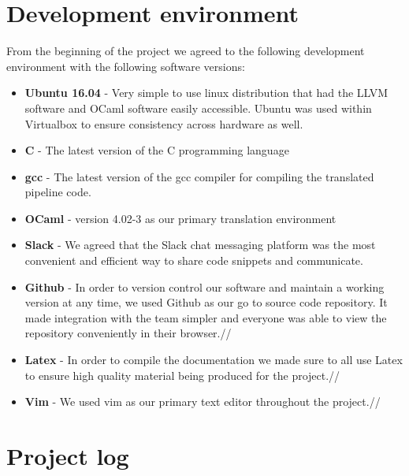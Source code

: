 \documentclass[./Report_main.tex]{subfiles}
\begin{document}
\section{Development environment}
From the beginning of the project we agreed to the following development environment with the following software versions:
\begin{itemize}
\item \textbf{Ubuntu 16.04} - Very simple to use linux distribution that had the LLVM software and OCaml
software easily accessible. Ubuntu was used within Virtualbox to ensure consistency across hardware
as well.\\
\item \textbf{C} - The latest version of the C programming language\\
\item \textbf{gcc} - The latest version of the gcc compiler for compiling the translated pipeline code.\\
\item \textbf{OCaml} - version 4.02-3 as our primary translation environment\\
\item \textbf{Slack} - We agreed that the Slack chat messaging platform was the most convenient and efficient way to share code snippets and communicate.
\item \textbf{Github} - In order to version control our software and maintain a working version at any time, we used Github as our go to source code repository. It made integration with the team simpler and everyone was able to view the repository conveniently in their browser.//
\item \textbf{Latex} - In order to compile the documentation we made sure to all use Latex to ensure high quality material being produced for the project.//
\item \textbf{Vim} - We used vim as our primary text editor throughout the project.//
\end{itemize}
\section{Project log}

\end{document}
